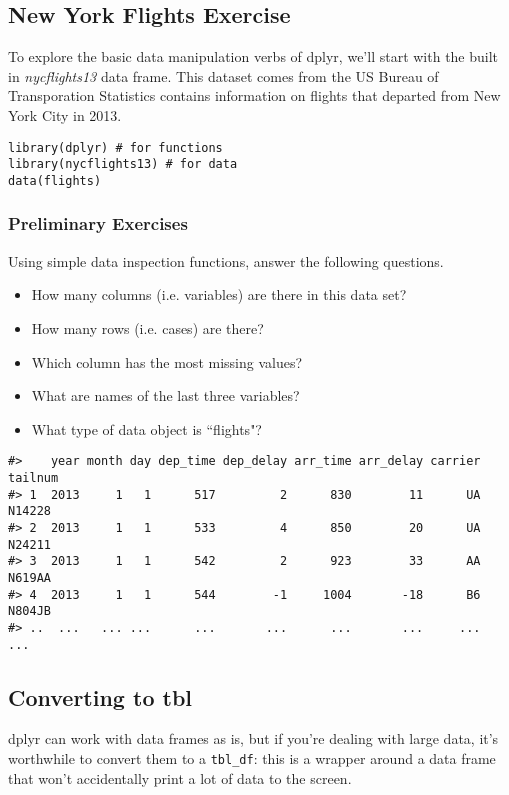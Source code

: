 \documentclass{article}
\begin{document}
\subsection*{New York Flights Exercise}

To explore the basic data manipulation verbs of dplyr, we’ll start with the built in \textit{nycflights13} data frame. This dataset comes from the US Bureau of Transporation Statistics contains information on flights that departed from New York City in 2013. 


\begin{framed}
\begin{verbatim}
library(dplyr) # for functions
library(nycflights13) # for data
data(flights)
\end{verbatim}
\end{framed}

\subsubsection*{Preliminary Exercises}
Using simple data inspection functions, answer the following questions.
\begin{itemize}
\item How many columns (i.e. variables) are there in this data set?
\item How many rows (i.e. cases) are there?
\item Which column has the most missing values?
\item What are names of the last three variables?
\item What type of data object is ``flights"?
\end{itemize}

\begin{framed}
\begin{verbatim}
#>    year month day dep_time dep_delay arr_time arr_delay carrier tailnum
#> 1  2013     1   1      517         2      830        11      UA  N14228
#> 2  2013     1   1      533         4      850        20      UA  N24211
#> 3  2013     1   1      542         2      923        33      AA  N619AA
#> 4  2013     1   1      544        -1     1004       -18      B6  N804JB
#> ..  ...   ... ...      ...       ...      ...       ...     ...     ...
\end{verbatim}
\end{framed}
\subsection{Converting to tbl}
dplyr can work with data frames as is, but if you’re dealing with large data, it’s worthwhile to convert them to a \texttt{tbl\_df}: this is a wrapper around a data frame that won’t accidentally print a lot of data to the screen.
\end{document}
